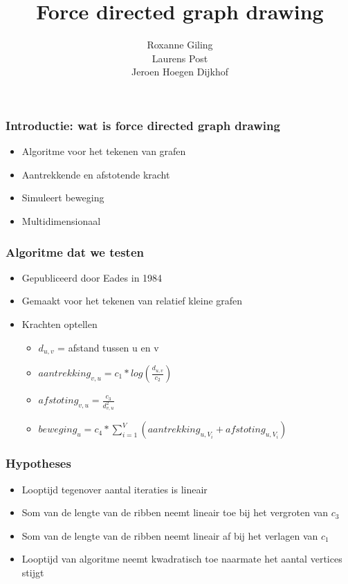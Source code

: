 \documentclass[16pt]{beamer}
\title{\textbf{Force directed graph drawing}}
\author{Roxanne Giling\\
		Laurens Post\\
		Jeroen Hoegen Dijkhof}
\date{}
\begin{document}
\begin{frame}
    \titlepage
\end{frame}

\begin{frame}
    \frametitle{Introductie: wat is force directed graph drawing}
    \begin{itemize}
        \item{Algoritme voor het tekenen van grafen}
        \item{Aantrekkende en afstotende kracht}
        \item{Simuleert beweging}
        \item{Multidimensionaal}
    \end{itemize}
\end{frame}

\begin{frame}
    \frametitle{Algoritme dat we testen}
    \begin{itemize}
        \item{Gepubliceerd door Eades in 1984}
        \item{Gemaakt voor het tekenen van relatief kleine grafen}
        \item{Krachten optellen}
        \begin{itemize}
            \item{
                 $d_{u,v}$ = afstand tussen u en v
            }
            \item{
                \begin{math}
                    aantrekking_{v,u} = c_1 * log(\frac{d_{u,v}}{c_2})
                \end{math}
            }
            \item{
                \begin{math}
                    afstoting_{v,u} = \frac{c_3}{d_{v,u}^2}
                \end{math}
            }
            \item {
                \begin{math}
                    beweging_u = c_4 * \sum_{i=1}^V{(aantrekking_{u,V_i} + afstoting_{u,V_i})}
                \end{math}
            }
        \end{itemize}
    \end{itemize}
\end{frame}

\begin{frame}
    \frametitle{Hypotheses}
    \begin{itemize}
        \item{Looptijd tegenover aantal iteraties is lineair}
        \item{Som van de lengte van de ribben neemt lineair toe bij het vergroten van $c_3$}
        \item{Som van de lengte van de ribben neemt lineair af bij het verlagen van $c_1$}
        \item{Looptijd van algoritme neemt kwadratisch toe naarmate het aantal vertices stijgt}
    \end{itemize}
\end{frame}
\end{document}
